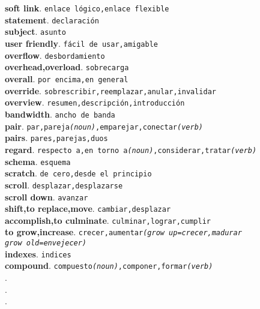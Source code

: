 \documentclass[twocolumn]{article}
\begin{document}
	\textsf{\textbf{soft link}}. \texttt{enlace l\'ogico,enlace flexible}\\
	\textsf{\textbf{statement}}. \texttt{declaraci\'on}\\
	\textsf{\textbf{subject}}. \texttt{asunto}\\
	\textsf{\textbf{user friendly}}. \texttt{f\'acil de usar,amigable}\\
	\textsf{\textbf{overflow}}. \texttt{desbordamiento}\\
	\textsf{\textbf{overhead,overload}}. \texttt{sobrecarga}\\
	\textsf{\textbf{overall}}. \texttt{por encima,en general}\\
	\textsf{\textbf{override}}. \texttt{sobrescribir,reemplazar,anular,invalidar}\\
	\textsf{\textbf{overview}}. \texttt{resumen,descripci\'on,introducci\'on}\\
	\textsf{\textbf{bandwidth}}. \texttt{ancho de banda}\\
	\textsf{\textbf{pair}}. \texttt{par,pareja{\scriptsize \textsl{(noun)}},emparejar,conectar{\scriptsize \textsl{(verb)}}}\\
	\textsf{\textbf{pairs}}. \texttt{pares,parejas,duos}\\
	\textsf{\textbf{regard}}. \texttt{respecto a,en torno a{\scriptsize \textsl{(noun)}},considerar,tratar{\scriptsize \textsl{(verb)}}}\\
	\textsf{\textbf{schema}}. \texttt{esquema}\\
	\textsf{\textbf{scratch}}. \texttt{de cero,desde el principio}\\
	\textsf{\textbf{scroll}}. \texttt{desplazar,desplazarse}\\
	\textsf{\textbf{scroll down}}. \texttt{avanzar}\\
	\textsf{\textbf{shift,to replace,move}}. \texttt{cambiar,desplazar}\\
	\textsf{\textbf{accomplish,to culminate}}. \texttt{culminar,lograr,cumplir}\\
	\textsf{\textbf{to grow,increase}}. \texttt{crecer,aumentar{\scriptsize \textsl{(grow up=crecer,madurar\\grow old=envejecer)}}}\\
	\textsf{\textbf{indexes}}. \texttt{indices}\\
	\textsf{\textbf{compound}}. \texttt{compuesto{\scriptsize \textsl{(noun)}},componer,formar{\scriptsize \textsl{(verb)}}}\\
	\textsf{\textbf{}}. \texttt{}\\
	\textsf{\textbf{}}. \texttt{}\\
	\textsf{\textbf{}}. \texttt{}\\
\end{document}
